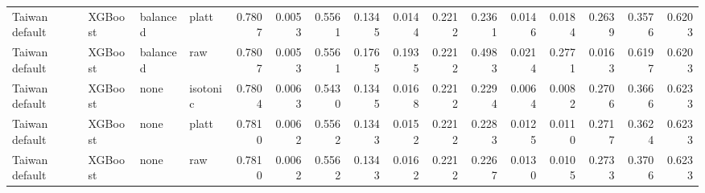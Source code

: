 \begin{tabular}{llllrrrrrrrrrrrr}
$$Taiwan default & XGBoost & balanced & platt & 0.7807 & 0.0053 & 0.5561 & 0.1345 & 0.0144 & 0.2212 & 0.2361 & 0.0146 & 0.0184 & 0.2639 & 0.3576 & 0.6203 \\
Taiwan default & XGBoost & balanced & raw & 0.7807 & 0.0053 & 0.5561 & 0.1765 & 0.1935 & 0.2212 & 0.4983 & 0.0214 & 0.2771 & 0.0163 & 0.6197 & 0.6203 \\
Taiwan default & XGBoost & none & isotonic & 0.7804 & 0.0063 & 0.5430 & 0.1345 & 0.0168 & 0.2212 & 0.2294 & 0.0064 & 0.0082 & 0.2706 & 0.3666 & 0.6233 \\
Taiwan default & XGBoost & none & platt & 0.7810 & 0.0062 & 0.5562 & 0.1343 & 0.0152 & 0.2212 & 0.2283 & 0.0125 & 0.0110 & 0.2717 & 0.3624 & 0.6233 \\
Taiwan default & XGBoost & none & raw & 0.7810 & 0.0062 & 0.5562 & 0.1343 & 0.0162 & 0.2212 & 0.2267 & 0.0130 & 0.0105 & 0.2733 & 0.3706 & 0.6233 \\
\bottomrule
\end{tabular}
